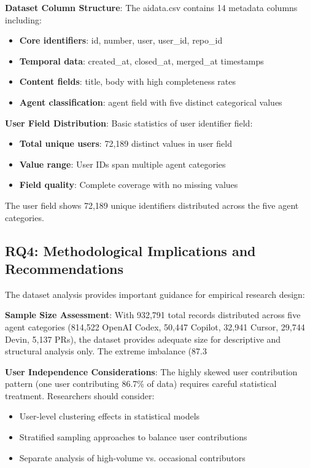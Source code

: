 \documentclass[conference]{IEEEtran}
\begin{document}
\textbf{Dataset Column Structure}: The aidata.csv contains 14 metadata columns including:
\begin{itemize}
    \item \textbf{Core identifiers}: id, number, user, user\_id, repo\_id  
    \item \textbf{Temporal data}: created\_at, closed\_at, merged\_at timestamps
    \item \textbf{Content fields}: title, body with high completeness rates
    \item \textbf{Agent classification}: agent field with five distinct categorical values
\end{itemize}

\textbf{User Field Distribution}: Basic statistics of user identifier field:
\begin{itemize}
    \item \textbf{Total unique users}: 72,189 distinct values in user field
    \item \textbf{Value range}: User IDs span multiple agent categories
    \item \textbf{Field quality}: Complete coverage with no missing values
\end{itemize}

The user field shows 72,189 unique identifiers distributed across the five agent categories.

\subsection{RQ4: Methodological Implications and Recommendations}

The dataset analysis provides important guidance for empirical research design:

\textbf{Sample Size Assessment}: With 932,791 total records distributed across five agent categories (814,522 OpenAI Codex, 50,447 Copilot, 32,941 Cursor, 29,744 Devin, 5,137 PRs), the dataset provides adequate size for descriptive and structural analysis only. The extreme imbalance (87.3%

\textbf{User Independence Considerations}: The highly skewed user contribution pattern (one user contributing 86.7\% of data) requires careful statistical treatment. Researchers should consider:
\begin{itemize}
    \item User-level clustering effects in statistical models
    \item Stratified sampling approaches to balance user contributions  
    \item Separate analysis of high-volume vs. occasional contributors
\end{itemize}
\end{document}
